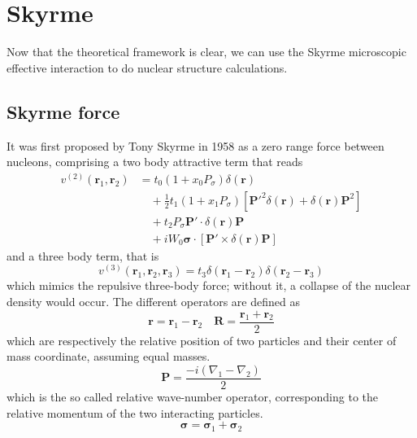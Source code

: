 \section{Skyrme}
\label{sec:skyrme}
Now that the theoretical framework is clear, we can use the Skyrme microscopic effective interaction to do nuclear structure calculations.
\subsection{Skyrme force}
It was first proposed by Tony Skyrme in 1958 \cite{SKYRME1958615} as a zero range force between nucleons, comprising a two body attractive term that reads
\begin{align*}
v^{(2)}(\mathbf{r}_1, \mathbf{r}_2) &= t_0 \left(1 + x_0 P_\sigma \right) \delta(\mathbf{r}) \\
&\quad + \frac{1}{2} t_1 \left(1 + x_1 P_\sigma \right) \left[ \mathbf{P}'^2 \delta(\mathbf{r}) + \delta(\mathbf{r}) \mathbf{P}^2 \right] \\
&\quad + t_2 P_\sigma  \mathbf{P}' \cdot \delta(\mathbf{r}) \mathbf{P} \\
&\quad + i W_0 \boldsymbol{\sigma}\cdot \left[ \mathbf{P}' \times \delta(\mathbf{r}) \mathbf{P} \right]
\end{align*}
and a three body term, that is
\begin{equation*}
    v^{(3)}(\bm r_1, \bm r_2, \bm r_3) = t_3\delta(\bm r_1-\bm r_2)\delta(\bm r_2 -\bm r_3)
\end{equation*}
which mimics the repulsive three-body force; without it, a collapse of the nuclear density would occur.
The different operators are defined as
\begin{equation}
\mathbf{r} = \mathbf{r}_1 - \mathbf{r}_2\quad \mathbf{R} = \frac{\mathbf{r}_1+\mathbf{r}_2}{2}
\end{equation}
which are respectively the relative position of two particles and their center of mass coordinate, assuming equal masses.
\begin{equation}
\mathbf{P} = \frac{-i(\nabla_1 - \nabla_2)}{2}
\end{equation}
which is the so called relative wave-number operator, corresponding to the relative momentum of the two interacting particles.
\begin{equation}
\boldsymbol{\sigma} = \boldsymbol{\sigma}_1 + \boldsymbol{\sigma}_2
\end{equation}
